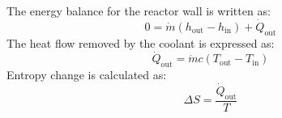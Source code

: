 The energy balance for the reactor wall is written as:  
\[
0 = \dot{m} (h_{\text{out}} - h_{\text{in}}) + \dot{Q}_{\text{out}}
\]  
The heat flow removed by the coolant is expressed as:  
\[
\dot{Q}_{\text{out}} = \dot{m} c (T_{\text{out}} - T_{\text{in}})
\]  
Entropy change is calculated as:  
\[
\Delta S = \frac{\dot{Q}_{\text{out}}}{T}
\]